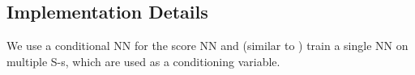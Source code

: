 \subsection{Implementation Details}
{%
We 
use a conditional NN for the score NN
and (similar to \cite{habi2024learning}) train a single NN  on multiple S-s, which are used as a conditioning variable. %
}
